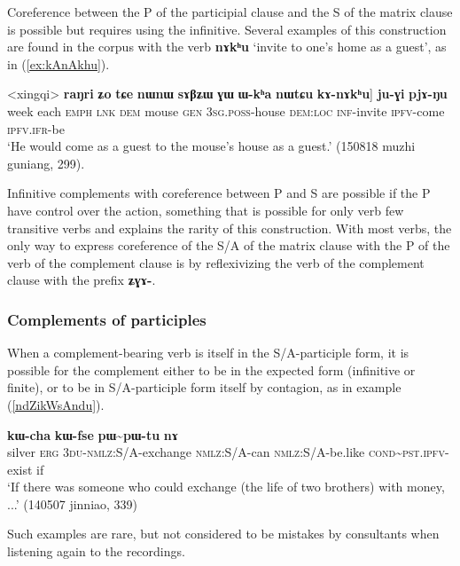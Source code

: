 \documentclass[oldfontcommands,oneside,a4paper,11pt]{article}
\newcommand{\ipa}[1]{\textbf{\phon#1}} %
\newcommand{\jpg}[2]{\ipa{#1} `#2'} %
\newcommand{\tld}{\textasciitilde{}}
\begin{document}
Coreference between the P of the participial clause and the S of the matrix clause is possible but requires using the infinitive. Several examples of this construction are found in the corpus with the verb \jpg{nɤkʰu}{invite to one's home as a guest}, as in (\ref{ex:kAnAkhu}).

\begin{exe}
\ex \label{ex:kAnAkhu}
\gll <xingqi> 	\ipa{raŋri} 	\ipa{ʑo} 	\ipa{tɕe} 	\ipa{nɯnɯ} \ipa{sɤβʑɯ} 	\ipa{ɣɯ} 	\ipa{ɯ-kʰa} 	\ipa{nɯtɕu} 	\ipa{kɤ-nɤkʰu}] 	\ipa{ju-ɣi} 	\ipa{pjɤ-ŋu} \\
week each \textsc{emph} \textsc{lnk} \textsc{dem} mouse \textsc{gen} \textsc{3sg.poss}-house \textsc{dem:loc} \textsc{inf}-invite \textsc{ipfv}-come \textsc{ipfv.ifr}-be \\
\glt `He would come as a guest to the mouse's house as a guest.' (150818 muzhi guniang, 299).
\end{exe}

Infinitive complements with coreference between P and S are possible if the P have control over the action, something that is possible for only verb few transitive verbs and explains the rarity of this construction. With most verbs, the only way to express coreference of the S/A of the matrix clause with the P of the verb of the complement clause is by reflexivizing the verb of the complement clause with the prefix \ipa{ʑɣɤ-}.
    
\subsubsection{Complements of participles}
When a complement-bearing verb is itself in the S/A-participle form, it is possible for the complement either to be in the expected form (infinitive or finite), or to be in S/A-participle form itself by contagion, as in example (\ref{ndZikWsAndu}).

\begin{exe}
\ex \label{ndZikWsAndu}
\gll [\ipa{rŋɯl} 	\ipa{kɯ} 	\ipa{ndʑi-kɯ-sɤndu}] 	\ipa{kɯ-cha} 	\ipa{kɯ-fse} 	\ipa{pɯ\tld{}pɯ-tu} 	\ipa{nɤ} \\
silver \textsc{erg} \textsc{3du-nmlz}:S/A-exchange \textsc{nmlz}:S/A-can \textsc{nmlz}:S/A-be.like 
\textsc{cond}\tld{}\textsc{pst.ipfv}-exist if \\
\glt `If there was someone who could exchange (the life of two brothers) with money, ...' (140507 jinniao, 339)
\end{exe}

Such examples are rare, but not considered to be mistakes by consultants when listening again to the recordings.
\end{document}
